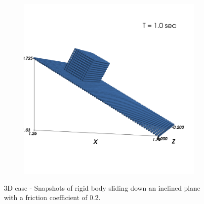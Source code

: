 \begin{figure}[!htpb]
  \begin{subfigure}{0.48\textwidth}
    \centering
    \includegraphics[width=1.0\textwidth]{figures/rfc/figures/mohseni_2021_free_sliding_on_a_slope_3d/fric_coeff_0_2/time2}
    \label{fig:passing-2}
  \end{subfigure}
  \caption{3D case - Snapshots of rigid body sliding down an inclined plane with a
    friction coefficient of $0.2$.}
\label{fig:mohseni-2021-sliding-3d}
\end{figure}



